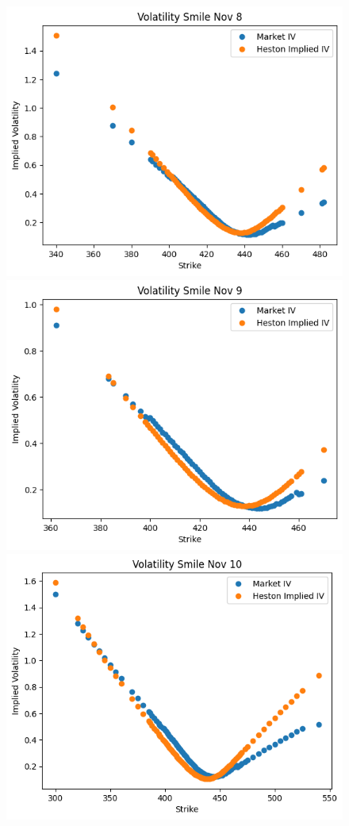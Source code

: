 \begin{figure}[H]
    \centering
    \includegraphics[scale=0.5]{fig/img/option_pricing/heston_smileNov8.png}
    \includegraphics[scale=0.5]{fig/img/option_pricing/hestonSmileNov9.png}
    \includegraphics[scale=0.5]{fig/img/option_pricing/hestonSmileNov10.png}

\end{figure}
